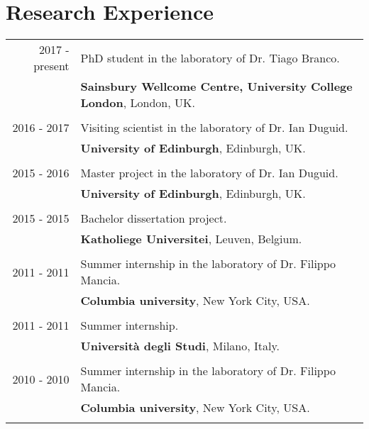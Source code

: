\documentclass[a4paper,10pt]{article}
\begin{document}
\section{Research Experience}
\begin{tabular}{r|p{11cm}}

    2017 - present & PhD student in the laboratory of Dr. Tiago Branco.  \\&
    \normalsize\textbf{Sainsbury Wellcome Centre, University College London}, London, UK.
    \\\multicolumn{2}{c}{} \\
 
    2016 - 2017 & Visiting scientist in the laboratory of Dr. Ian Duguid.  \\&
    \normalsize\textbf{University of Edinburgh}, Edinburgh, UK.
    \\\multicolumn{2}{c}{} \\
 
    2015 - 2016 & Master project in the laboratory of Dr. Ian Duguid.  \\&
    \normalsize\textbf{University of Edinburgh}, Edinburgh, UK.
    \\\multicolumn{2}{c}{} \\
 
    2015 - 2015 & Bachelor dissertation project.  \\&
    \normalsize\textbf{Katholiege Universitei}, Leuven, Belgium.
    \\\multicolumn{2}{c}{} \\
 
    2011 - 2011 & Summer internship in the laboratory of Dr. Filippo Mancia.  \\&
    \normalsize\textbf{Columbia university}, New York City, USA.
    \\\multicolumn{2}{c}{} \\
 
    2011 - 2011 & Summer internship.  \\&
    \normalsize\textbf{Università degli Studi}, Milano, Italy.
    \\\multicolumn{2}{c}{} \\
    
    2010 - 2010 & Summer internship in the laboratory of Dr. Filippo Mancia.  \\&
    \normalsize\textbf{Columbia university}, New York City, USA.
    \\\multicolumn{2}{c}{} \\
\end{tabular}
\end{document}
